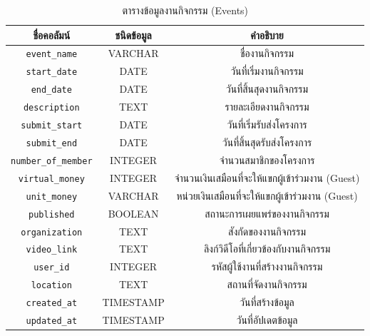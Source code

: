 \begin{table}[ht]
    \centering
    \begin{tabular}{|c|c|c|}
        \hline
        ชื่อคอลัมน์                  & ชนิดข้อมูล   & คำอธิบาย                                 \\ \hline
        \verb |event_name|       & VARCHAR   & ชื่องานกิจกรรม                            \\ \hline
        \verb |start_date|       & DATE      & วันที่เริ่มงานกิจกรรม                        \\ \hline
        \verb |end_date|         & DATE      & วันที่สิ้นสุดงานกิจกรรม                       \\ \hline
        \verb |description|      & TEXT      & รายละเอียดงานกิจกรรม                     \\ \hline
        \verb |submit_start|     & DATE      & วันที่เริ่มรับส่งโครงการ                      \\ \hline
        \verb |submit_end|       & DATE      & วันที่สิ้นสุดรับส่งโครงการ                     \\ \hline
        \verb |number_of_member| & INTEGER   & จำนวนสมาชิกของโครงการ                    \\ \hline
        \verb |virtual_money|    & INTEGER   & จำนวนเงินเสมือนที่จะให้แขกผู้เข้าร่วมงาน (Guest) \\ \hline
        \verb |unit_money|       & VARCHAR   & หน่วยเงินเสมือนที่จะให้แขกผู้เข้าร่วมงาน (Guest) \\ \hline
        \verb |published|        & BOOLEAN   & สถานะการเผยแพร่ของงานกิจกรรม             \\ \hline
        \verb |organization|     & TEXT      & สังกัดของงานกิจกรรม                       \\ \hline
        \verb |video_link|       & TEXT      & ลิงก์วิดีโอที่เกี่ยวข้องกับงานกิจกรรม             \\ \hline
        \verb |user_id|          & INTEGER   & รหัสผู้ใช้งานที่สร้างงานกิจกรรม                \\ \hline
        \verb |location|         & TEXT      & สถานที่จัดงานกิจกรรม                       \\ \hline
        \verb |created_at|       & TIMESTAMP & วันที่สร้างข้อมูล                            \\ \hline
        \verb |updated_at|       & TIMESTAMP & วันที่อัปเดตข้อมูล                           \\ \hline
    \end{tabular}
    \caption{ตารางข้อมูลงานกิจกรรม (Events)}
    \label{tab:event_data}
\end{table}

